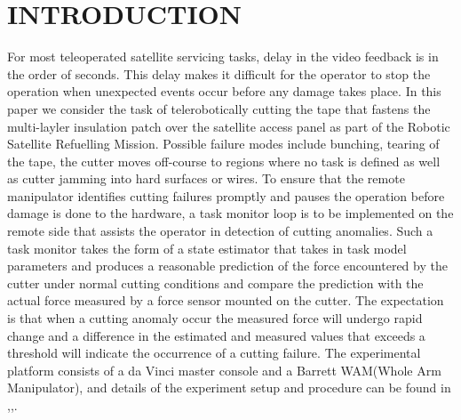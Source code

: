\documentclass[letterpaper, 10 pt, conference]{ieeeconf}  %
\begin{document}
\section{INTRODUCTION}
\label{sec:1}

For most teleoperated satellite servicing tasks, delay in the video feedback is in the order of seconds. This delay makes it difficult for the operator to stop the operation when unexpected events occur before any damage takes place. In this paper we consider the task of telerobotically cutting the tape that fastens the multi-layler insulation patch over the satellite access panel as part of the Robotic Satellite Refuelling Mission. Possible failure modes include bunching, tearing of the tape, the cutter moves off-course to regions where no task is defined as well as cutter jamming into hard surfaces or wires. To ensure that the remote manipulator identifies cutting failures promptly and pauses the operation before damage is done to the hardware, a task monitor loop is to be implemented on the remote side that assists the operator in detection of cutting anomalies. Such a task monitor takes the form of a state estimator that takes in task model parameters and produces a reasonable prediction of the force encountered by the cutter under normal cutting conditions and compare the prediction with the actual force measured by a force sensor mounted on the cutter. The expectation is that when a cutting anomaly occur the measured force will undergo rapid change and a difference in the estimated and measured values that exceeds a threshold will indicate the occurrence of a cutting failure. The experimental platform consists of a da Vinci master console and a Barrett WAM(Whole Arm Manipulator), and details of the experiment setup and procedure can be found in \cite{isha},\cite{2012iros},\cite{icra2013}.
\end{document}
